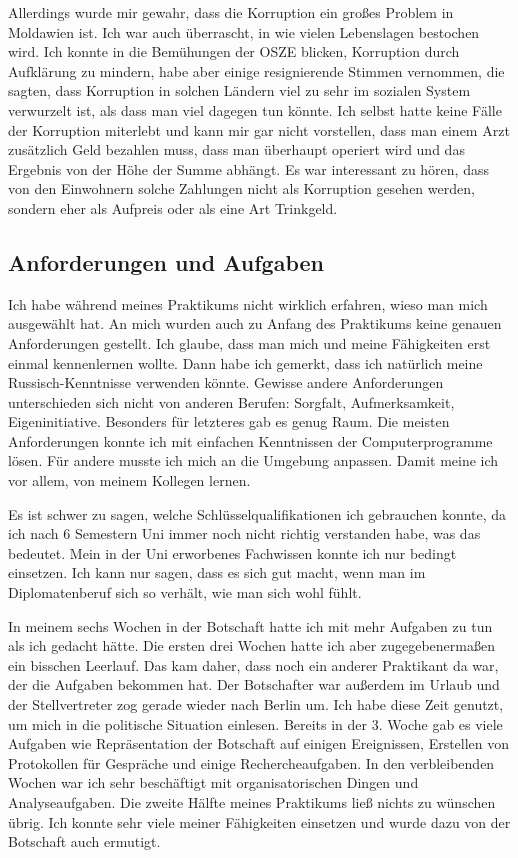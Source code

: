 \documentclass[12pt,a4paper, headsepline]{scrartcl}
\begin{document}
Allerdings wurde mir gewahr, dass die Korruption ein großes Problem in Moldawien ist. Ich war auch überrascht, in wie vielen Lebenslagen bestochen wird. Ich konnte in die Bemühungen der OSZE blicken, Korruption durch Aufklärung zu mindern, habe aber einige resignierende Stimmen vernommen, die sagten, dass Korruption in solchen Ländern viel zu sehr im sozialen System verwurzelt ist, als dass man viel dagegen tun könnte. Ich selbst hatte keine Fälle der Korruption miterlebt und kann mir gar nicht vorstellen, dass man einem Arzt zusätzlich Geld bezahlen muss, dass man überhaupt operiert wird und das Ergebnis von der Höhe der Summe abhängt. Es war interessant zu hören, dass von den Einwohnern solche Zahlungen nicht als Korruption gesehen werden, sondern eher als Aufpreis oder als eine Art Trinkgeld.

\subsection{Anforderungen und Aufgaben}
Ich habe während meines Praktikums nicht wirklich erfahren, wieso man mich ausgewählt hat. An mich wurden auch zu Anfang des Praktikums keine genauen Anforderungen gestellt. Ich glaube, dass man mich und meine Fähigkeiten erst einmal kennenlernen wollte. Dann habe ich gemerkt, dass ich natürlich meine Russisch-Kenntnisse verwenden könnte. Gewisse andere Anforderungen unterschieden sich nicht von anderen Berufen: Sorgfalt, Aufmerksamkeit, Eigeninitiative. Besonders für letzteres gab es genug Raum. Die meisten Anforderungen konnte ich mit einfachen Kenntnissen der Computerprogramme lösen. Für andere musste ich mich an die Umgebung anpassen. Damit meine ich vor allem, von meinem Kollegen lernen.

Es ist schwer zu sagen, welche Schlüsselqualifikationen ich gebrauchen konnte, da ich nach 6 Semestern Uni immer noch nicht richtig verstanden habe, was das bedeutet. Mein in der Uni erworbenes Fachwissen konnte ich nur bedingt einsetzen. Ich kann nur sagen, dass es sich gut macht, wenn man im Diplomatenberuf sich so verhält, wie man sich wohl fühlt.

In meinem sechs Wochen in der Botschaft hatte ich mit mehr Aufgaben zu tun als ich gedacht hätte. Die ersten drei Wochen hatte ich aber zugegebenermaßen ein bisschen Leerlauf. Das kam daher, dass noch ein anderer Praktikant da war, der die Aufgaben bekommen hat. Der Botschafter war außerdem im Urlaub und der Stellvertreter zog gerade wieder nach Berlin um. Ich habe diese Zeit genutzt, um mich in die politische Situation einlesen. Bereits in der 3. Woche gab es viele Aufgaben wie Repräsentation der Botschaft auf einigen Ereignissen, Erstellen von Protokollen für Gespräche und einige Rechercheaufgaben. In den verbleibenden Wochen war ich sehr beschäftigt mit organisatorischen Dingen und Analyseaufgaben. Die zweite Hälfte meines Praktikums ließ nichts zu wünschen übrig. Ich konnte sehr viele meiner Fähigkeiten einsetzen und wurde dazu von der Botschaft auch ermutigt.
\end{document}
